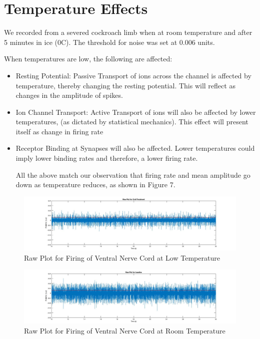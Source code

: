 \documentclass{article}
\begin{document}
\section{Temperature Effects}

We recorded from a severed cockroach limb when at room temperature and after 5 minutes in ice (0C). The threshold for noise was set at 0.006 units.


When temperatures are low, the following are affected:
\begin{itemize}
	\item Resting Potential: Passive Transport of ions across the channel is affected by temperature, thereby changing the resting potential. This will reflect as changes in the amplitude of spikes.
	\item Ion Channel Transport: Active Transport of ions will also be affected by lower temperatures, (as dictated by statistical mechanics). This effect will present itself as change in firing rate
	\item Receptor Binding at Synapses will also be affected. Lower temperatures could imply lower binding rates and therefore, a lower firing rate.

All the above match our observation that firing rate and mean amplitude go down as temperature reduces, as shown in Figure 7.

\end{itemize}
\begin{figure}
	\centering
  \includegraphics[width=\linewidth]{Cold_Raw.jpg}
  \caption{Raw Plot for Firing of Ventral Nerve Cord at Low Temperature}
  \label{fig:cold_raw}
\end{figure}

\begin{figure}
	\centering
  \includegraphics[width=\linewidth]{Temperature_Baseline.jpg}
  \caption{Raw Plot for Firing of Ventral Nerve Cord at Room Temperature}
  \label{fig:room_temp_raw}
\end{figure}
\end{document}
